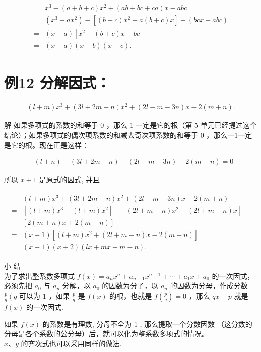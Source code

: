 \documentclass[10pt]{article}
\begin{document}
\begin{align*}
\begin{aligned}
& x^{3}-(a+b+c) x^{2}+(a b+b c+c a) x-a b c \\
= & \left(x^{3}-a x^{2}\right)-\left[(b+c) x^{2}-a(b+c) x\right]+(b c x-a b c) \\
= & (x-a)\left[x^{2}-(b+c) x+b c\right] \\
= & (x-a)(x-b)(x-c) .
\end{aligned}
\end{align*}

\section*{例12 分解因式：}
\begin{align*}
(l+m) x^{3}+(3 l+2 m-n) x^{2}+(2 l-m-3 n) x-2(m+n) .
\end{align*}

解 如果多项式的系数的和等于 0 ，那么 1 一定是它的根（第 5 单元已经提过这个结论）；如果多项式的偶次项系数的和减去奇次项系数的和等于 0 ，那么一1一定是它的根。现在正是这样：

\begin{align*}
-(l+n)+(3 l+2 m-n)-(2 l-m-3 n)-2(m+n)=0
\end{align*}

所以 $x+1$ 是原式的因式, 并且

\begin{align*}
\begin{aligned}
& (l+m) x^{3}+(3 l+2 m-n) x^{2}+(2 l-m-3 n) x-2(m+n) \\
= & {\left[(l+m) x^{3}+(l+m) x^{2}\right]+\left[(2 l+m-n) x^{2}+(2 l+m-n) x\right]-} \\
& {[2(m+n) x+2(m+n)] } \\
= & (x+1)\left[(l+m) x^{2}+(2 l+m-n) x-2(m+n)\right] \\
= & (x+1)(x+2)(l x+m x-m-n) .
\end{aligned}
\end{align*}

小 结\\
为了求出整系数多项式 $f(x)=a_{n} x^{n}+a_{n-1} x^{n-1}+\cdots+a_{1} x+a_{0}$ 的一次因式，必须先把 $a_{0}$ 与 $a_{n}$ 分解，以 $a_{0}$ 的因数为分子，以 $a_{n}$ 的因数为分母，作成分数 $\frac{p}{q}\left(q\right.$ 可以为 1 ，如果 $\frac{p}{q}$ 是 $f(x)$ 的根，也就是 $f\left(\frac{p}{q}\right)=0$ ，那么 $q x-p$ 就是 $f(x)$ 的一次因式.

如果 $f(x)$ 的系数是有理数, 分母不全为 1 , 那么提取一个分数因数 （这分数的分母是各个系数的公分母）后，就可以化为整系数多项式的情况。\\
$x 、 y$ 的齐次式也可以采用同样的做法.
\end{document}
